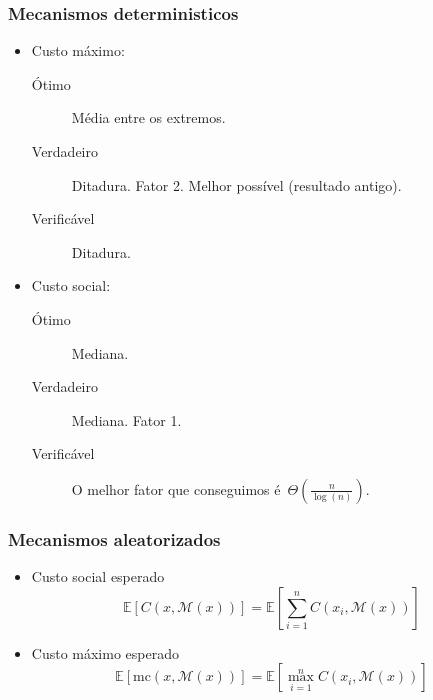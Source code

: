 \documentclass[usenames,dvipsnames]{beamer}
\begin{document}
\begin{frame}
\frametitle{Mecanismos deterministicos}

\begin{itemize}
\item Custo máximo:
\begin{description}
\item [Ótimo] Média entre os extremos.
\item [Verdadeiro] Ditadura. Fator 2. Melhor possível (resultado antigo).
\item [Verificável] Ditadura.
\end{description}
\item Custo social:
\begin{description}
\item [Ótimo] Mediana.
\item [Verdadeiro] Mediana. Fator 1.
\item [Verificável] O melhor fator que conseguimos é~$\Theta\left(\frac{n}{\log(n)}\right)$.
\end{description}
\end{itemize}
\end{frame}

%

\begin{frame}
\frametitle{Mecanismos aleatorizados}

\begin{itemize}
\item Custo social esperado\\ $$\mathbb{E}[ C(x,\mathcal{M}(x)) ] = \mathbb{E}\left[ \sum\limits_{i=1}^n C(x_i,\mathcal{M}(x)) \right]$$
\item Custo máximo esperado\\ $$\mathbb{E}[ \text{mc}(x,\mathcal{M}(x)) ] = \mathbb{E}\left[ \max\limits_{i=1}^n C(x_i,\mathcal{M}(x)) \right]$$
\end{itemize}

\end{frame}
\end{document}
